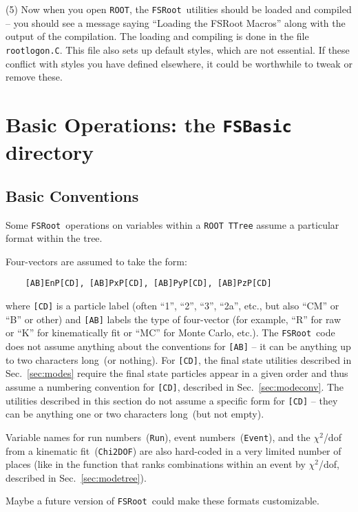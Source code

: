 \documentclass[11pt]{article}
\newcommand{\FSR}{{\tt FSRoot}}
\newcommand{\ROOT}{{\tt ROOT}}
\begin{document}
(5) Now when you open \ROOT, the \FSR\ utilities should be loaded and compiled -- you should see a message saying ``Loading the FSRoot Macros'' along with the output of the compilation.  The loading and compiling is done in the file {\tt rootlogon.C}.  This file also sets up default styles, which are not essential.  If these conflict with styles you have defined elsewhere, it could be worthwhile to tweak or remove these.

\section{Basic Operations:  the {\tt FSBasic} directory}

\subsection{Basic Conventions}
\label{sec:conventions}

Some \FSR\ operations on variables within a \ROOT\ {\tt TTree} assume a particular format within the tree.  

Four-vectors are assumed to take the form:
\begin{verbatim}
    [AB]EnP[CD], [AB]PxP[CD], [AB]PyP[CD], [AB]PzP[CD]
\end{verbatim}
where {\tt [CD]} is a particle label (often ``1'', ``2'', ``3'', ``2a'', etc., but also ``CM'' or ``B'' or other) and {\tt [AB]} labels the type of four-vector (for example, ``R'' for raw or ``K'' for kinematically fit or ``MC'' for Monte Carlo, etc.).  The \FSR\ code does not assume anything about the conventions for {\tt [AB]} -- it can be anything up to two characters long~(or nothing).  For {\tt [CD]}, the final state utilities described in Sec.~\ref{sec:modes} require the final state particles appear in a given order and thus assume a numbering convention for {\tt [CD]}, described in Sec.~\ref{sec:modeconv}.  The utilities described in this section do not assume a specific form for {\tt [CD]} -- they can be anything one or two characters long~(but not empty).

Variable names for run numbers~({\tt Run}), event numbers~({\tt Event}), and the $\chi^2$/dof from a kinematic fit~({\tt Chi2DOF}) are also hard-coded in a very limited number of places (like in the function that ranks combinations within an event by $\chi^2$/dof, described in Sec.~\ref{sec:modetree}).

Maybe a future version of \FSR\ could make these formats customizable.
\end{document}
